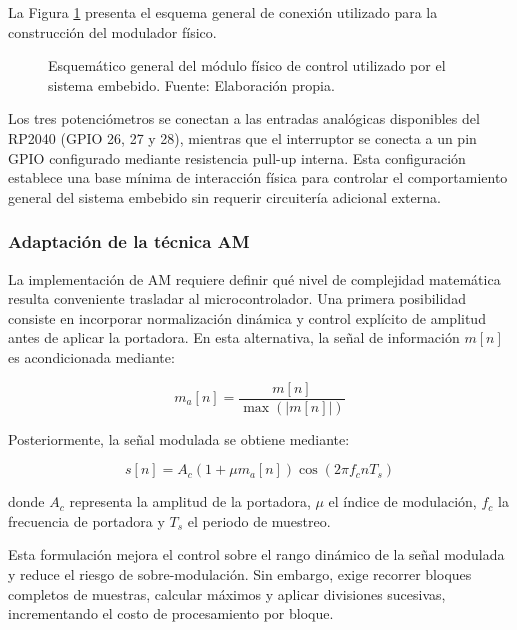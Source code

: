 La Figura \ref{fig:pico_schematic} presenta el esquema general de conexión utilizado para la construcción del modulador físico.

\begin{figure}[H]
    \centering
    \resizebox{0.60\textwidth}{!}{
    
    }
    \caption{Esquemático general del módulo físico de control utilizado por el sistema embebido. Fuente: Elaboración propia.}
    \label{fig:pico_schematic}
\end{figure}

Los tres potenciómetros se conectan a las entradas analógicas disponibles del RP2040 (GPIO 26, 27 y 28), mientras que el interruptor se conecta a un pin GPIO configurado mediante resistencia pull-up interna. Esta configuración establece una base mínima de interacción física para controlar el comportamiento general del sistema embebido sin requerir circuitería adicional externa.


\subsubsection{Adaptación de la técnica AM}

La implementación de AM requiere definir qué nivel de complejidad matemática resulta conveniente trasladar al microcontrolador. Una primera posibilidad consiste en incorporar normalización dinámica y control explícito de amplitud antes de aplicar la portadora. En esta alternativa, la señal de información $m[n]$ es acondicionada mediante:

\begin{equation}
m_a[n] = \frac{m[n]}{\max(|m[n]|)}
\label{eq:am_normalizacion_completa}
\end{equation}

Posteriormente, la señal modulada se obtiene mediante:

\begin{equation}
s[n] = A_c \left(1 + \mu m_a[n]\right)\cos(2\pi f_c nT_s)
\label{eq:am_mod_completa}
\end{equation}

donde $A_c$ representa la amplitud de la portadora, $\mu$ el índice de modulación, $f_c$ la frecuencia de portadora y $T_s$ el periodo de muestreo.

Esta formulación mejora el control sobre el rango dinámico de la señal modulada y reduce el riesgo de sobre-modulación. Sin embargo, exige recorrer bloques completos de muestras, calcular máximos y aplicar divisiones sucesivas, incrementando el costo de procesamiento por bloque.

